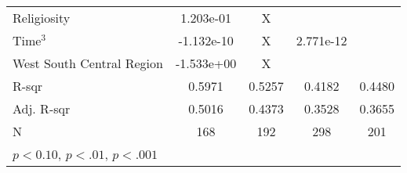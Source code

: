 {\begin{tabular}{l*{4}{c}}
    \addlinespace
    Religiosity               & 1.203e-01\sym{*}   & X            &                    &                    \\
    \addlinespace
    Time$^3$                  & -1.132e-10         & X            & 2.771e-12\sym{*}   &                    \\
    \addlinespace
    West South Central Region & -1.533e+00\sym{**} & X            &                    &                    \\
    \midrule
    R-sqr                     & 0.5971             & 0.5257       & 0.4182             & 0.4480             \\
    Adj. R-sqr                & 0.5016             & 0.4373       & 0.3528             & 0.3655             \\
    N                         & 168                & 192          & 298                & 201                \\
    \bottomrule
    \multicolumn{4}{l}{\footnotesize \sym{*} \(p<0.10\), \sym{**} \(p<.01\), \sym{***} \(p<.001\)}          \\
\end{tabular}
}
